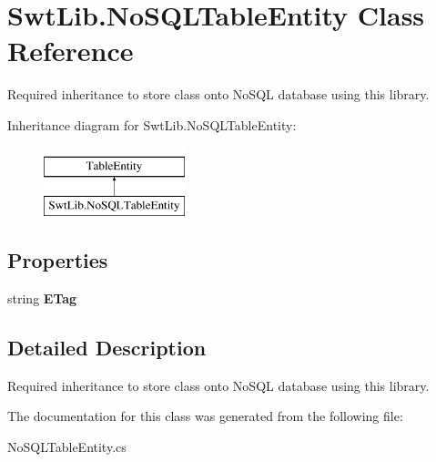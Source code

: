\hypertarget{class_swt_lib_1_1_no_s_q_l_table_entity}{\section{Swt\-Lib.\-No\-S\-Q\-L\-Table\-Entity Class Reference}
\label{class_swt_lib_1_1_no_s_q_l_table_entity}
}


Required inheritance to store class onto No\-S\-Q\-L database using this library.  


Inheritance diagram for Swt\-Lib.\-No\-S\-Q\-L\-Table\-Entity\-:\begin{figure}[H]
\begin{center}
\leavevmode
\includegraphics[height=2.000000cm]{class_swt_lib_1_1_no_s_q_l_table_entity}
\end{center}
\end{figure}
\subsection*{Properties}
\begin{DoxyCompactItemize}
\item 
\hypertarget{class_swt_lib_1_1_no_s_q_l_table_entity_a44b8cbabae5fdec01c1d06ab658d93a4}{string {\bfseries E\-Tag}}\label{class_swt_lib_1_1_no_s_q_l_table_entity_a44b8cbabae5fdec01c1d06ab658d93a4}

\end{DoxyCompactItemize}


\subsection{Detailed Description}
Required inheritance to store class onto No\-S\-Q\-L database using this library. 



The documentation for this class was generated from the following file\-:\begin{DoxyCompactItemize}
\item 
No\-S\-Q\-L\-Table\-Entity.\-cs\end{DoxyCompactItemize}
